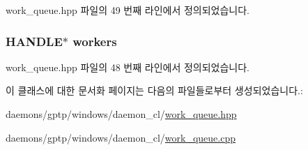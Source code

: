 work\+\_\+queue.\+hpp 파일의 49 번째 라인에서 정의되었습니다.

\subsubsection[{\texorpdfstring{workers}{workers}}]{\setlength{\rightskip}{0pt plus 5cm}H\+A\+N\+D\+LE$\ast$ workers\hspace{0.3cm}{\ttfamily [private]}}\hypertarget{class_windows_work_queue_a9cbdd44e71a21ed9af56a4442c340768}{}\label{class_windows_work_queue_a9cbdd44e71a21ed9af56a4442c340768}


work\+\_\+queue.\+hpp 파일의 48 번째 라인에서 정의되었습니다.



이 클래스에 대한 문서화 페이지는 다음의 파일들로부터 생성되었습니다.\+:\begin{DoxyCompactItemize}
\item 
daemons/gptp/windows/daemon\+\_\+cl/\hyperlink{work__queue_8hpp}{work\+\_\+queue.\+hpp}\item 
daemons/gptp/windows/daemon\+\_\+cl/\hyperlink{work__queue_8cpp}{work\+\_\+queue.\+cpp}\end{DoxyCompactItemize}
